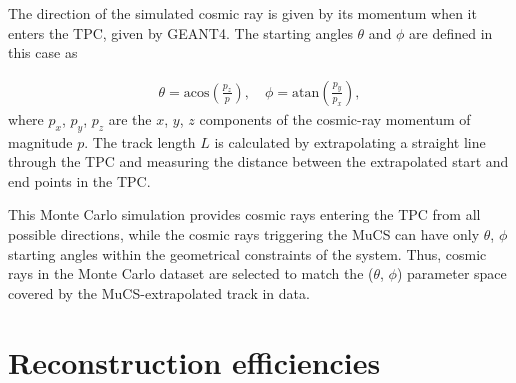 \documentclass[a4paper,11pt]{article}
\begin{document}

The direction of the simulated cosmic ray is given by its momentum when it enters the TPC, given by GEANT4. The starting angles $\theta$ and $\phi$ are defined in this case as

\begin{align}\label{eq:angles_mc}
  \theta = \mathrm{acos}\left(\frac{p_{z}}{p}\right), \quad
  \phi = \mathrm{atan}\left(\frac{p_{y}}{p_{x}}\right),
\end{align}
where $p_{x}$, $p_{y}$, $p_{z}$ are the $x$, $y$, $z$ components of the cosmic-ray momentum of magnitude $p$.
The track length $L$ is calculated by extrapolating a straight line through the TPC and measuring the distance between the extrapolated start and end points in the TPC.

This Monte Carlo simulation provides cosmic rays entering the TPC from all possible directions, while the cosmic rays triggering the MuCS can have only $\theta$, $\phi$ starting angles within the geometrical constraints of the system. Thus, cosmic rays in the Monte Carlo dataset are selected to match the ($\theta$, $\phi$) parameter space covered by the MuCS-extrapolated track in data.


\section{Reconstruction efficiencies}\label{sec:reco}
\end{document}

